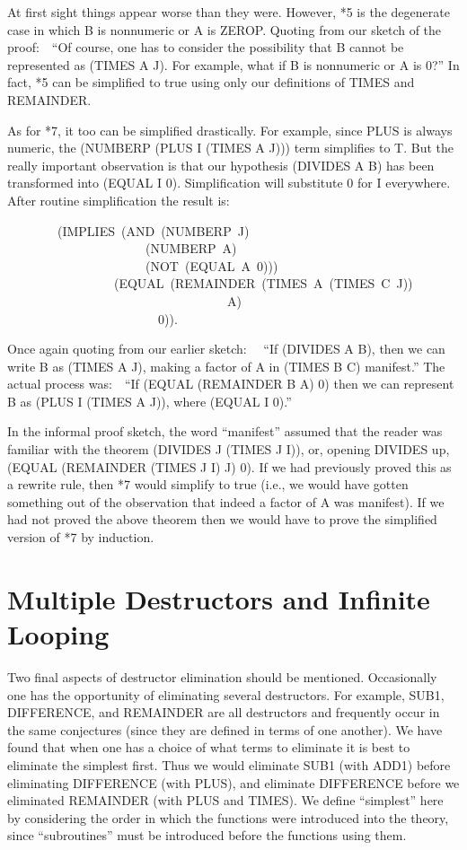 \documentclass[11pt]{book}
\newenvironment{pubasis}{\begin{flushleft}\ttfamily\small}{\normalsize\rmfamily\end{flushleft}}
\newcommand{\pubdefaulttextsize}{\large}
\begin{document}
At first sight things appear worse than they
were.
However, *5 is the degenerate case in which B is nonnumeric or 
A is ZEROP.  Quoting from our sketch of the proof:~~``Of course, one has to consider the possibility that B cannot be represented
as (TIMES A J).  For example, what if B is nonnumeric or A is 0?''
In fact, *5 can be simplified to true using only
our definitions of TIMES and REMAINDER.

As for *7, it too can be simplified drastically.  For example,
since PLUS is always numeric, the (NUMBERP (PLUS I (TIMES A J)))
term simplifies to T.  But the really important observation is that our
hypothesis (DIVIDES A B) has been transformed into (EQUAL I 0).
Simplification will substitute 0 for I everywhere.  After
routine simplification the result is:
\begin{pubasis}
~~~~~~~~(IMPLIES~(AND~(NUMBERP~J)\\
~~~~~~~~~~~~~~~~~~~~~~(NUMBERP~A)\\
~~~~~~~~~~~~~~~~~~~~~~(NOT~(EQUAL~A~0)))\\
~~~~~~~~~~~~~~~~~(EQUAL~(REMAINDER~(TIMES~A~(TIMES~C~J))\\
~~~~~~~~~~~~~~~~~~~~~~~~~~~~~~~~~~~A)\\
~~~~~~~~~~~~~~~~~~~~~~~~0)).\\
\end{pubasis}
Once again quoting from our earlier sketch:~~
``If (DIVIDES A B), then we can
write B as (TIMES A J), making a factor of A in (TIMES B C) manifest.''
The actual process was:~~``If (EQUAL (REMAINDER B A) 0) then we
can represent B as (PLUS I (TIMES A J)), where (EQUAL I 0).''

In the informal proof sketch, the word ``manifest'' assumed that the
reader was familiar with the
theorem (DIVIDES J (TIMES J I)), or, opening DIVIDES up, (EQUAL (REMAINDER (TIMES J I) J) 0).
If we had previously proved this as a rewrite rule, then *7 would
simplify to true (i.e., we would have gotten something out of the
observation that indeed a factor of A was manifest).  If we had not proved the above
theorem then we would have to prove the simplified version of *7
by induction.
\section{Multiple Destructors and Infinite Looping}
\pubdefaulttextsize
Two final aspects of destructor elimination should be mentioned.
Occasionally one has the opportunity of eliminating several destructors.
For example, SUB1, DIFFERENCE, and REMAINDER are all destructors and
frequently occur in the same conjectures (since they are defined
in terms of one another).  We have found that when one has a choice
of what terms to eliminate it is best to eliminate the simplest first.
Thus we would eliminate SUB1 (with ADD1) before eliminating
DIFFERENCE (with PLUS), and eliminate DIFFERENCE before we eliminated
REMAINDER (with PLUS and TIMES).  We  define ``simplest''
here by  considering the order in which the functions
were introduced into the theory,
since ``subroutines'' must be introduced before the functions using
them.
\end{document}
